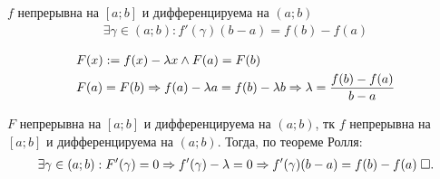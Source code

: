 \documentclass{article}
\begin{document}

\theorem

$f$ непрерывна на $[a;b]$ и дифференцируема на $(a;b)$
\begin{align*}
	\exists \gamma\in(a;b):f'(\gamma)(b-a)=f(b)-f(a)
\end{align*}

\proof
\begin{align*}
	 & F(x):=f(x)-\lambda x \land F(a)=F(b)                                             \\
	 & F(a)=F(b) \Rightarrow f(a)-\lambda a=f(b)-\lambda b\Rightarrow \lambda=\frac{f(b)-f(a)}{b-a}
\end{align*}

$F$ непрерывна на $[a;b]$ и дифференцируема на $(a;b)$, тк $f$ непрерывна на $[a;b]$ и дифференцируема на $(a;b)$. Тогда, по теореме Ролля:
\begin{align*}
	\exists\gamma\in(a;b):F'(\gamma)=0 \Rightarrow f'(\gamma)-\lambda=0\Rightarrow f'(\gamma)(b-a)=f(b)-f(a)\;\square.
\end{align*}
\end{document}
